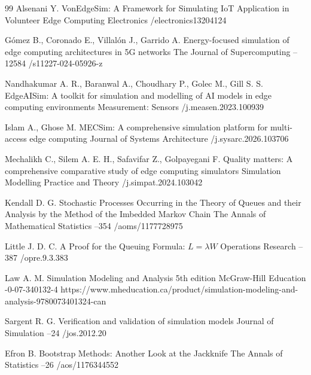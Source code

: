 \begin{thebibliography}{99}
\by Alsenani Y.
\paper VonEdgeSim: A Framework for Simulating IoT Application in Volunteer Edge Computing
\jour Electronics
/electronics13204124

\by G\'omez B., Coronado E., Villal\'on J., Garrido A.
\paper Energy-focused simulation of edge computing architectures in 5G networks
\jour The Journal of Supercomputing
--12584
/s11227-024-05926-z

\by Nandhakumar A. R., Baranwal A., Choudhary P., Golec M., Gill S. S.
\paper EdgeAISim: A toolkit for simulation and modelling of AI models in edge computing environments
\jour Measurement: Sensors
/j.measen.2023.100939

\by Islam A., Ghose M.
\paper MECSim: A comprehensive simulation platform for multi-access edge computing
\jour Journal of Systems Architecture
/j.sysarc.2026.103706

\by Mechalikh C., Silem A. E. H., Safavifar Z., Golpayegani F.
\paper Quality matters: A comprehensive comparative study of edge computing simulators
\jour Simulation Modelling Practice and Theory
/j.simpat.2024.103042

\by Kendall D. G.
\paper Stochastic Processes Occurring in the Theory of Queues and their Analysis by the Method of the Imbedded Markov Chain
\jour The Annals of Mathematical Statistics
--354
/aoms/1177728975

\by Little J. D. C.
\paper A Proof for the Queuing Formula: $L=\lambda W$
\jour Operations Research
--387
/opre.9.3.383

\by Law A. M.
\book Simulation Modeling and Analysis
\edition 5th edition
\publ McGraw-Hill Education
-0-07-340132-4
\URL https://www.mheducation.ca/product/simulation-modeling-and-analysis-9780073401324-can

\by Sargent R. G.
\paper Verification and validation of simulation models
\jour Journal of Simulation
--24
/jos.2012.20

\by Efron B.
\paper Bootstrap Methods: Another Look at the Jackknife
\jour The Annals of Statistics
--26
/aos/1176344552


\end{thebibliography}
